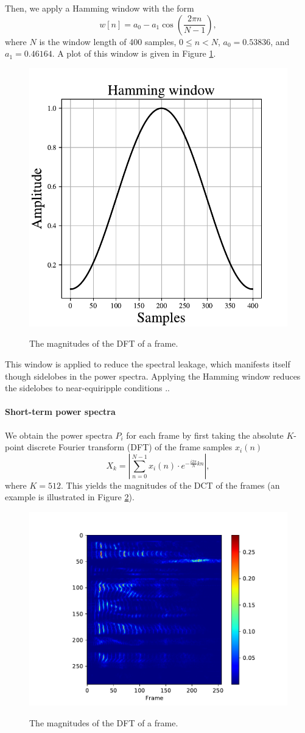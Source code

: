 			Then, we apply a Hamming window with the form
			\begin{equation}
				w\left[n\right] = a_0 - a_1\cos\left(\frac{2\pi n}{N-1}\right),
			\end{equation}
			where $N$ is the window length of 400 samples, $0 \leq n < N$, $a_0 = 0.53836$, and $a_1 = 0.46164$.
			A plot of this window is given in Figure \ref{fig:hamming}.
			\begin{figure}[ht]
				\centering
			    \includegraphics[width=.45\linewidth]{gfx/hamming}
			    \label{fig:hamming}
			    \caption{The magnitudes of the DFT of a frame.}
			\end{figure}
			This window is applied to reduce the spectral leakage, which manifests itself though sidelobes in the power spectra.
			Applying the Hamming window reduces the sidelobes to near-equiripple conditions \citep{SASPWEB2011}..

		\paragraph{Short-term power spectra}

			We obtain the power spectra $P_i$ for each frame by first taking the absolute $K$-point discrete Fourier transform (DFT) of the frame samples $x_i(n)$
			\begin{equation}\label{eq:magframes}
				X_k = \left|\sum_{n=0}^{N-1}x_i(n)\cdot e^{-\frac{i2\pi}{N}kn}\right|,
			\end{equation}
			where $K=512$.
			This yields the magnitudes of the DCT of the frames (an example is illustrated in Figure \ref{fig:magframes}).
			\begin{figure}[ht]
				\centering
			    \includegraphics[width=.45\linewidth]{gfx/magframes}
			    \label{fig:magframes}
			    \caption{The magnitudes of the DFT of a frame.}
			\end{figure}

